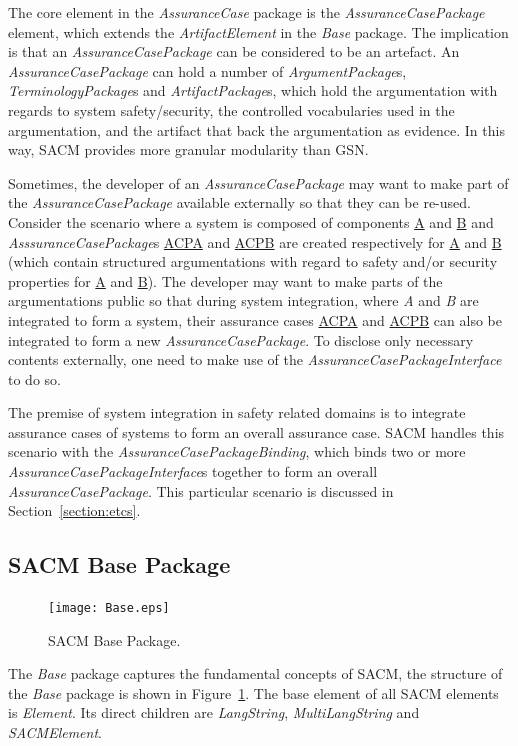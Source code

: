 The core element in the \textit{AssuranceCase} package is the \textit{AssuranceCasePackage} element, which extends the \textit{ArtifactElement} in the \textit{Base} package. 
The implication is that an \textit{AssuranceCasePackage} can be considered to be an artefact. 
An \textit{AssuranceCasePackage} can hold a number of \textit{ArgumentPackage}s, \textit{TerminologyPackage}s and \textit{ArtifactPackage}s, which hold the argumentation with regards to system safety/security, the controlled vocabularies used in the argumentation, and the artifact that back the argumentation as evidence.
In this way, SACM provides more granular modularity than GSN. 

Sometimes, the developer of an \textit{AssuranceCasePackage} may want to make part of the \textit{AssuranceCasePackage} available externally so that they can be re-used. 
Consider the scenario where a system is composed of components \underline{A} and \underline{B} and \textit{AsssuranceCasePackage}s \underline{ACPA} and \underline{ACPB} are created respectively for \underline{A} and \underline{B} (which contain structured argumentations with regard to safety and/or security properties for \underline{A} and \underline{B}). 
The developer may want to make parts of the argumentations public so that during system integration, where \textit{A} and \textit{B} are integrated to form a system, their assurance cases \underline{ACPA} and \underline{ACPB} can also be integrated to form a new \textit{AssuranceCasePackage}. 
To disclose only necessary contents externally, one need to make use of the \textit{AssuranceCasePackageInterface} to do so. 

The premise of system integration in safety related domains is to integrate assurance cases of systems to form an overall assurance case. SACM handles this scenario with the \textit{AssuranceCasePackageBinding}, which binds two or more \textit{AssuranceCasePackageInterface}s together to form an overall \textit{AssuranceCasePackage}. This particular scenario is discussed in Section~\ref{section:etcs}.

\subsection{SACM Base Package}
\label{sec:basePack}

\begin{figure}[ht!]
	\centering
	\texttt{[image: Base.eps]}
	\caption{SACM Base Package.}
	\label{fig:base}
\end{figure}
The \textit{Base} package captures the fundamental concepts of SACM, the structure of the \textit{Base} package is shown in Figure~\ref{fig:base}. 
The base element of all SACM elements is \textit{Element}. 
Its direct children are \textit{LangString}, \textit{MultiLangString} and \textit{SACMElement}.

